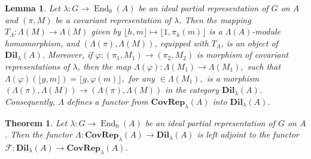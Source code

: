 \documentclass[10pt,a4paper]{amsart}
\newtheorem{lemma}{Lemma}
\newtheorem{theorem}{Theorem}
\newcommand{\F}{\mathcal{F}}
\begin{document}
\begin{lemma}\label{l: T for Lambda M}
    Let \(\lambda: G \to \operatorname{End}_0(A)\) be  an ideal partial representation  of \( G \) on \(A\) and \((\pi, M)\) be a covariant representation of \(\lambda\). Then the mapping \( T_\Lambda: \Lambda(M) \to \Lambda(M) \) given by \( \lfloor h, m \rfloor \mapsto \lfloor 1, \pi_h(m) \rfloor \) is a \(\Lambda(A)\)-module homomorphism, and \((\Lambda(\pi), \Lambda(M))\), equipped with \( T_\Lambda \), is an object of   \(\textbf{Dil}_{\lambda}(A)\). Moreover, if 
    $\varphi : (\pi _1, M_1) \to  (\pi _2, M_2) $ is morphism of covariant representations of \(\lambda\), then the map $\Lambda (\varphi ) : \Lambda (M_1) \to \Lambda (M_1),$ such that $\Lambda (\varphi )(\lfloor g,m \rfloor )= \lfloor g, \varphi (m) \rfloor,$
    for any $\in \Lambda (M_1),$ is a morphism 
    \((\Lambda(\pi), \Lambda(M)) \to (\Lambda(\pi), \Lambda(M))\) in the category \(\textbf{Dil}_{\lambda}(A)\).  Consequently, \(\Lambda\) defines a functor from  \(\textbf{CovRep}_{\lambda} (A)\) into \(\textbf{Dil}_{\lambda}(A)\).
\end{lemma}

\begin{theorem}
    Let \(\lambda: G \to \operatorname{End}_0(A)\) be  an ideal  partial representation  of \(G\) on \(A\). Then the functor 
    \(
    \Lambda: \textbf{CovRep}_{\lambda}(A) \to \textbf{Dil}_{\lambda}(A) 
    \)
    is left adjoint to the functor 
    \(
    \F: \textbf{Dil}_{\lambda}(A) \to \textbf{CovRep}_{\lambda}(A).
    \)
\end{theorem}
\end{document}
